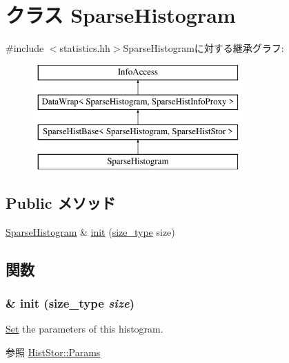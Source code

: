\hypertarget{classStats_1_1SparseHistogram}{
\section{クラス SparseHistogram}
\label{classStats_1_1SparseHistogram}
}


{\ttfamily \#include $<$statistics.hh$>$}SparseHistogramに対する継承グラフ:\begin{figure}[H]
\begin{center}
\leavevmode
\includegraphics[height=4cm]{classStats_1_1SparseHistogram}
\end{center}
\end{figure}
\subsection*{Public メソッド}
\begin{DoxyCompactItemize}
\item 
\hyperlink{classStats_1_1SparseHistogram}{SparseHistogram} \& \hyperlink{classStats_1_1SparseHistogram_ab0c2f3007484b0d317b4fe06909ee8a3}{init} (\hyperlink{namespaceStats_ada51e68d31936547d3729c82daf6b7c6}{size\_\-type} size)
\end{DoxyCompactItemize}


\subsection{関数}
\hypertarget{classStats_1_1SparseHistogram_ab0c2f3007484b0d317b4fe06909ee8a3}{
\subsubsection[{init}]{\& init ({\bf size\_\-type} {\em size})}}
\label{classStats_1_1SparseHistogram_ab0c2f3007484b0d317b4fe06909ee8a3}
\hyperlink{classSet}{Set} the parameters of this histogram. \begin{DoxySeeAlso}{参照}
\hyperlink{structStats_1_1HistStor_1_1Params}{HistStor::Params} 
\end{DoxySeeAlso}

